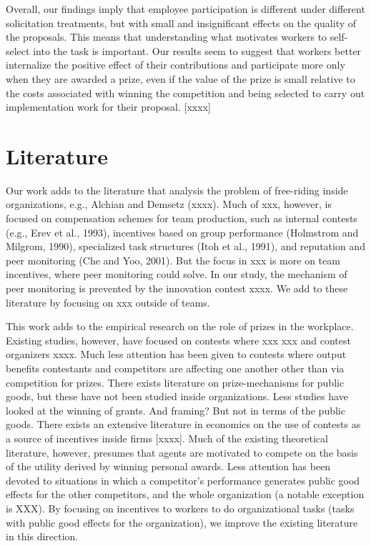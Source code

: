 \documentclass[11pt, titlepage]{article}
\begin{document}
Overall, our findings imply that employee participation is different
under different solicitation treatments, but with small and
insignificant effects on the quality of the proposals. This means that
understanding what motivates workers to self-select into the task is
important. Our results seem to suggest that workers better internalize
the positive effect of their contributions and participate more only
when they are awarded a prize, even if the value of the prize is small
relative to the costs associated with winning the competition and being
selected to carry out implementation work for their proposal. {[}xxxx{]}

\section{Literature}\label{literature}

Our work adds to the literature that analysis the problem of free-riding
inside organizations, e.g., Alchian and Demsetz (xxxx). Much of xxx,
however, is focused on compensation schemes for team production, such as
internal contests (e.g., Erev et al., 1993), incentives based on group
performance (Holmstrom and Milgrom, 1990), specialized task structures
(Itoh et al., 1991), and reputation and peer monitoring (Che and Yoo,
2001). But the focus in xxx is more on team incentives, where peer
monitoring could solve. In our study, the mechanism of peer monitoring
is prevented by the innovation contest xxxx. We add to these literature
by focusing on xxx outside of teams.

This work adds to the empirical research on the role of prizes in the
workplace. Existing studies, however, have focused on contests where xxx
xxx and contest organizers xxxx. Much less attention has been given to
contests where output benefits contestants and competitors are affecting
one another other than via competition for prizes. There exists
literature on prize-mechanisms for public goods, but these have not been
studied inside organizations. Less studies have looked at the winning of
grants. And framing? But not in terms of the public goods. There exists
an extensive literature in economics on the use of contests as a source
of incentives inside firms {[}xxxx{]}. Much of the existing theoretical
literature, however, presumes that agents are motivated to compete on
the basis of the utility derived by winning personal awards. Less
attention has been devoted to situations in which a competitor's
performance generates public good effects for the other competitors, and
the whole organization (a notable exception is XXX). By focusing on
incentives to workers to do organizational tasks (tasks with public good
effects for the organization), we improve the existing literature in
this direction.
\end{document}

